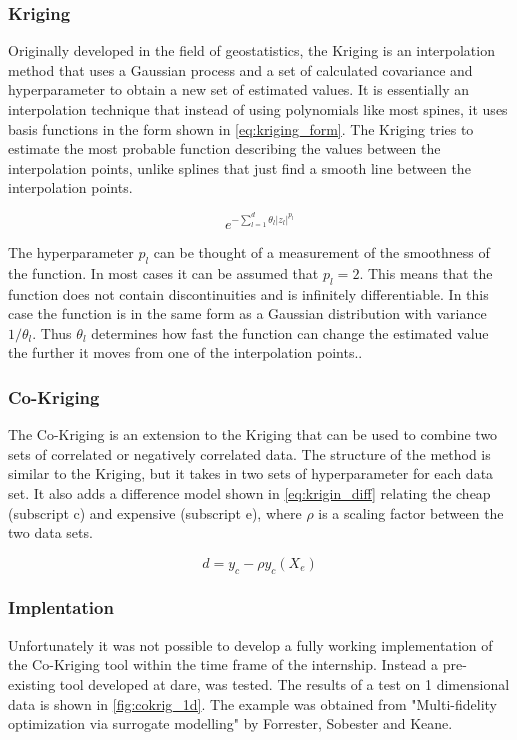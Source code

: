 \subsubsection{Kriging}
Originally developed in the field of geostatistics, the Kriging is an interpolation method that uses a Gaussian process and a set of calculated covariance and hyperparameter to obtain a new set of estimated values. It is essentially an interpolation technique that instead of using polynomials like most spines, it uses basis functions in the form shown in \ref{eq:kriging_form}. The Kriging tries to estimate the most probable function describing the values between the interpolation points, unlike splines that just find a smooth line between the interpolation points.\cite{jones2001taxonomy}

\begin{equation}
    {e^{ - \sum\nolimits_{l = 1}^d {{\theta_l}{{\left| {{z_l}} \right|}^{{p_l}}}} }}
    \label{eq:kriging_form}
\end{equation}

The hyperparameter $p_l$ can be thought of a measurement of the smoothness of the function. In most cases it can be assumed that $p_l=2$. This means that the function does not contain discontinuities and is infinitely differentiable. In this case the function is in the same form as a Gaussian distribution with variance $1/\theta_l$. Thus $\theta_l$ determines how fast the function can change the estimated value the further it moves from one of the interpolation points.\cite{forrester2007multi}.

\subsubsection{Co-Kriging}
The Co-Kriging is an extension to the Kriging that can be used to combine two sets of correlated or negatively correlated data. The structure of the method is similar to the Kriging, but it takes in two sets of hyperparameter for each data set. It also adds a difference model shown in \autoref{eq:krigin_diff} relating the cheap (subscript c) and expensive (subscript e), where $\rho$ is a scaling factor between the two data sets.

\begin{equation}
    d = y_c-\rho y_c(X_e)
    \label{eq:krigin_diff}
\end{equation}


\subsubsection{Implentation}
Unfortunately it was not possible to develop a fully working implementation of the Co-Kriging tool within the time frame of the internship. Instead a pre-existing tool developed at \gls{dare}, was tested. The results of a test on 1 dimensional data is shown in \autoref{fig:cokrig_1d}. The example was obtained from "Multi-fidelity optimization via surrogate modelling" by Forrester, Sobester and Keane\cite{forrester2007multi}.\\

